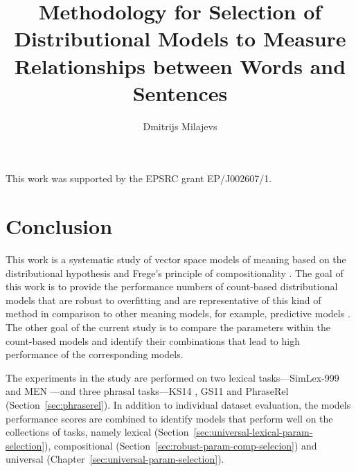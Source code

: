 \documentclass[11pt,a4paper,english,oneside]{book}
\title{Methodology for Selection of Distributional Models to Measure Relationships between Words and Sentences}
\author{Dmitrijs Milajevs}
\renewcommand\cite\citep
\begin{document}
\maketitle
\addtocounter{page}{1}


\cleardoublepage

\vspace*{\fill}
\begin{center}
This work was supported by the EPSRC grant EP/J002607/1.
\end{center}
\vfill



\cleardoublepage

\tableofcontents

\cleardoublepage
\listoffigures

\cleardoublepage
\listoftables









\chapter{Conclusion}

This work is a systematic study of vector space models of meaning based on the distributional hypothesis \cite{harris1954distributional} and Frege's principle of compositionality \cite{Janssen2001,DBLP:journals/corr/abs-1003-4394}. The goal of this work is to provide the performance numbers of count-based distributional models that are robust to overfitting and are representative of this kind of method in comparison to other meaning models, for example, predictive models \cite{mikolov2013efficient}. The other goal of the current study is to compare the parameters within the count-based models and identify their combinations that lead to high performance of the corresponding models.

The experiments in the study are performed on two lexical tasks---SimLex-999 \cite{hill2014simlex} and MEN \cite{Bruni:2014:MDS:2655713.2655714}---and three phrasal tasks---KS14 \cite{kartsadrqpl2014}, GS11 \cite{Grefenstette:2011:ETV:2140490.2140497} and PhraseRel (Section~\ref{sec:phraserel}). In addition to individual dataset evaluation, the models performance scores are combined to identify models that perform well on the collections of tasks, namely lexical (Section~\ref{sec:universal-lexical-param-selection}), compositional (Section~\ref{sec:robust-param-comp-selecion}) and universal (Chapter~\ref{sec:universal-param-selection}).
\end{document}
